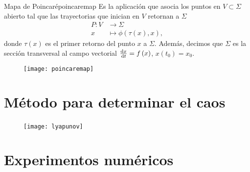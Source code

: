 \begin{frame}
	\frametitle{\subsecname}

	\begin{minipage}{0.6\textwidth}
		\begin{definition}{Mapa de Poincaré}{poincaremap}
			Es la aplicación que asocia los puntos en $V\subset\Sigma$ abierto
			tal que las trayectorias que inician en $V$ retornan a $\Sigma$
			\begin{align*}
				P\colon V & \to\Sigma                                      \\
				x         & \mapsto\phi\left(\tau\left(x\right), x\right),
			\end{align*}
			donde $\tau\left(x\right)$ es el primer retorno del punto $x$ a $\Sigma$.
			Además, decimos que $\Sigma$ es la sección transversal al campo vectorial
			$\diff{x}{t}=f\left(x\right)$, $x\left(t_{0}\right)=x_{0}$.
		\end{definition}
	\end{minipage}
	\begin{minipage}{0.3\textwidth}
		\begin{figure}[ht!]
			\centering
			\texttt{[image: poincaremap]}
		\end{figure}
	\end{minipage}

\end{frame}



\section{Método para determinar el caos}

\begin{frame}
	\frametitle{\secname}

	\begin{figure}[ht!]
		\centering
		\texttt{[image: lyapunov]}
	\end{figure}
\end{frame}

\section{Experimentos numéricos}

